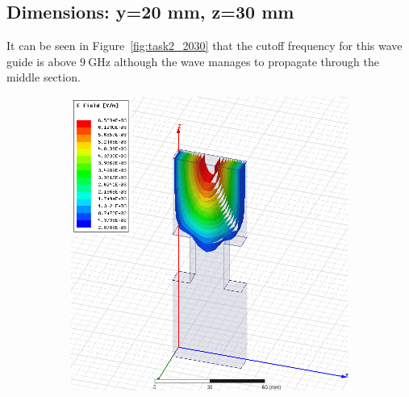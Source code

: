\documentclass[12pt,a4paper]{article}
\begin{document}
\subsection{Dimensions: y=20 mm, z=30 mm}
It can be seen in Figure~\ref{fig:task2_2030} that the cutoff frequency for this wave guide is above $\SI{9}{\giga\hertz}$ although the wave manages to propagate through the middle section.
\begin{figure}
  \centering
  \begin{subfigure}[b]{0.49\textwidth}
    \includegraphics[width=\textwidth]{./mid_sec_20mm_wide_30mm_long/4ghz.png}
    \label{fig:2_2030_4ghz}
  \end{subfigure}
  \begin{subfigure}[b]{0.49\textwidth}

\end{subfigure}
\end{figure}
\end{document}

